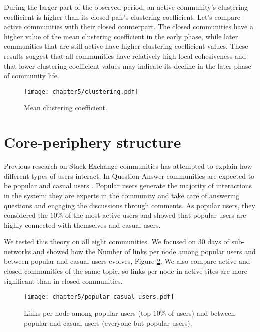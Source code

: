 During the larger part of the observed period, an active community’s clustering coefficient is higher than its closed pair’s clustering coefficient. Let’s compare active communities with their closed counterpart. The closed communities have a higher value of the mean clustering coefficient in the early phase, while later communities that are still active have higher clustering coefficient values. These results suggest that all communities have relatively high local cohesiveness and that lower clustering coefficient values may indicate its decline in the later phase of community life. 

\begin{figure}
	\centering
	\texttt{[image: chapter5/clustering.pdf]}%
	\caption{Mean clustering coefficient.}
	\label{fig:clustering}
\end{figure}

\section{Core-periphery structure}

Previous research on Stack Exchange communities has attempted to explain how different types of users interact. In Question-Answer communities are expected to be popular and casual users \cite{santos2019activity, santos2019self}. Popular users generate the majority of interactions in the system; they are experts in the community and take care of answering questions and engaging the discussions through comments. As popular users, they considered the $10 \%$ of the most active users and showed that popular users are highly connected with themselves and casual users.

We tested this theory on all eight communities. We focused on 30 days of sub-networks and showed how the Number of links per node among popular users and between popular and casual users evolves, Figure \ref{fig:pop_cas_users}. We also compare active and closed communities of the same topic, so links per node in active sites are more significant than in closed communities.

\begin{figure}[h!]
	\centering
	\texttt{[image: chapter5/popular\_casual\_users.pdf]}
	\caption[Number of links per node]{Links per node among popular users (top 10\% of users) and between popular and casual users (everyone but popular users).}
	\label{fig:pop_cas_users}
\end{figure} 

